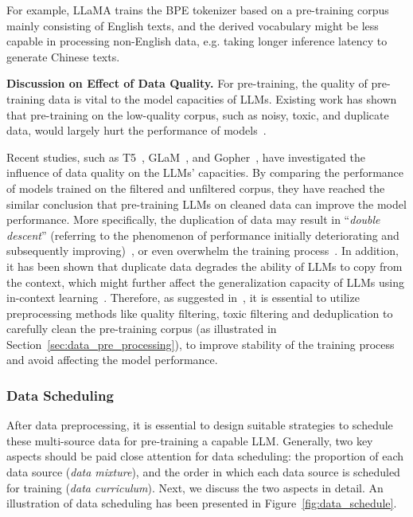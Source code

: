 For example, LLaMA trains the BPE tokenizer  based on a pre-training corpus mainly consisting of English texts, and the derived vocabulary might be less capable in processing non-English data, e.g. taking longer inference latency to generate Chinese texts. 

\textbf{Discussion on Effect of Data Quality.} For pre-training, the quality of pre-training data is vital to the  model capacities of LLMs. Existing work has shown that pre-training on the low-quality corpus, such as noisy, toxic, and duplicate data, would largely hurt the performance of models~\cite{Rae-arxiv-2021-Scaling, Lee-ACL-2022-Deduplicating, Kandpal-ICML-2022-Deduplicating, Hernandez-arxiv-2022-Scaling}.

Recent studies, such as T5~\cite{Raffel-JMLR-2020-Exploring}, GLaM~\cite{Du-ICML-2022-GLaM}, and Gopher~\cite{Rae-arxiv-2021-Scaling}, have investigated the influence of data quality on the LLMs' capacities. By comparing the performance of models trained on the filtered and unfiltered corpus, they have reached the similar conclusion that pre-training LLMs on cleaned data can improve the model performance. More specifically, the duplication of data may result in ``\emph{double descent}'' (referring to the phenomenon of performance initially deteriorating and subsequently improving)~\cite{Hernandez-arxiv-2022-Scaling,Nakkiran-ICLR-2020-Deep}, or even overwhelm the training process~\cite{Hernandez-arxiv-2022-Scaling}. In addition, it has been shown that duplicate data degrades the ability of LLMs to copy from the context, which might further affect the generalization capacity of LLMs using in-context learning~\cite{Hernandez-arxiv-2022-Scaling}. Therefore, as suggested in~\cite{Rae-arxiv-2021-Scaling, Scao-arxiv-2022-BLOOM, Chowdhery-arxiv-2022-PaLM, Longpre-arxiv-2023-pretrainer}, it is essential to utilize  preprocessing methods like quality filtering, toxic filtering and deduplication to carefully clean  the pre-training corpus  (as illustrated in Section~\ref{sec:data_pre_processing}), to improve stability of the training process and avoid affecting the model performance.

\subsubsection{Data Scheduling}
\label{sec:data_scheduling}
After data preprocessing, it is essential to design suitable strategies to schedule these multi-source data  for pre-training a capable LLM. Generally, two key aspects should be paid close attention for data scheduling: the proportion of each data source (\emph{data mixture}), and the order in which each data source is scheduled for training (\emph{data curriculum}). Next, we discuss the two aspects in detail. An illustration of data scheduling has been presented in Figure~\ref{fig:data_schedule}.

